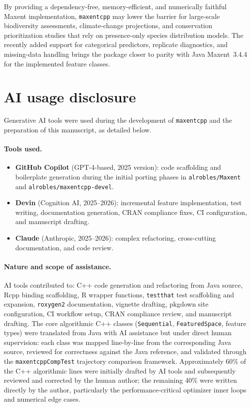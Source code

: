 \documentclass[10pt,letterpaper]{article}
\begin{document}
By providing a dependency-free, memory-efficient, and numerically faithful
Maxent implementation, \texttt{maxentcpp} may lower the barrier for
large-scale biodiversity assessments, climate-change projections, and
conservation prioritization studies that rely on presence-only species
distribution models.
The recently added support for categorical predictors, replicate
diagnostics, and missing-data handling brings the package closer to
parity with Java Maxent~3.4.4 for the implemented feature classes.

\section*{AI usage disclosure}

Generative AI tools were used during the development of
\texttt{maxentcpp} and the preparation of this manuscript, as detailed
below.

\paragraph{Tools used.}
\begin{itemize}[leftmargin=*,nosep]
  \item \textbf{GitHub Copilot} (GPT-4-based, 2025 version): code
    scaffolding and boilerplate generation during the initial porting
    phases in \texttt{alrobles/Maxent} and
    \texttt{alrobles/maxentcpp-devel}.
  \item \textbf{Devin} (Cognition AI, 2025--2026): incremental feature
    implementation, test writing, documentation generation, CRAN
    compliance fixes, CI configuration, and manuscript drafting.
  \item \textbf{Claude} (Anthropic, 2025--2026): complex refactoring,
    cross-cutting documentation, and code review.
\end{itemize}

\paragraph{Nature and scope of assistance.}
AI tools contributed to: C++ code generation and refactoring from Java
source, Rcpp binding scaffolding, R wrapper functions, \texttt{testthat}
test scaffolding and expansion, \texttt{roxygen2} documentation,
vignette drafting, pkgdown site configuration, CI workflow setup, CRAN
compliance review, and manuscript drafting.
The core algorithmic C++ classes (\texttt{Sequential},
\texttt{FeaturedSpace}, feature types) were translated from Java with AI
assistance but under direct human supervision: each class was mapped
line-by-line from the corresponding Java source, reviewed for
correctness against the Java reference, and validated through the
\texttt{maxentcppCompTest} trajectory comparison framework.
Approximately 60\% of the C++ algorithmic lines were initially drafted
by AI tools and subsequently reviewed and corrected by the human author;
the remaining 40\% were written directly by the author, particularly
the performance-critical optimizer inner loops and numerical edge cases.
\end{document}
